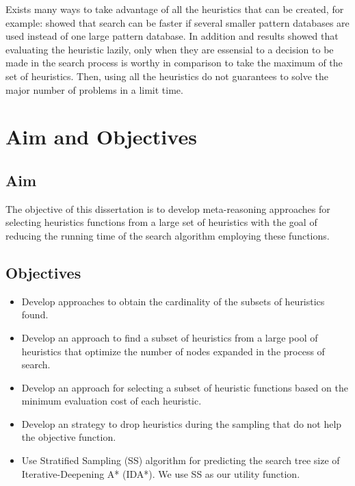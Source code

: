 Exists many ways to take advantage of all the heuristics that can be created, for example: \citep{holte2006maximizing} showed that search can be faster if several smaller pattern databases are used instead of one large pattern database. In addition \citep{domshlak2010max} and \citep{tolpin2013towards} results showed that evaluating the heuristic lazily, only when they are essensial to a decision to be made in the search process is worthy in comparison to take the maximum of the set of heuristics. Then, using all the heuristics do not guarantees to solve the major number of problems in a limit time.

\section{Aim and Objectives}
\subsection{Aim}
\noindent
The objective of this dissertation is to develop meta-reasoning approaches for selecting heuristics functions from a large set of heuristics with the goal of reducing the running time of the search algorithm employing these functions.

\subsection{Objectives}
\noindent

\begin{itemize}
  \item Develop approaches to obtain the cardinality of the subsets of heuristics found.
  
  \item Develop an approach to find a subset of heuristics from a large pool of heuristics that optimize the number of nodes expanded in the process of search.
  
  \item Develop an approach for selecting a subset of heuristic functions based on the minimum evaluation cost of each heuristic.
  
  \item Develop an strategy to drop heuristics during the sampling that do not help the objective function.  
  
  \item Use Stratified Sampling (SS) algorithm for predicting the search tree size of Iterative-Deepening A* (IDA*). We use SS as our utility function.
   
\end{itemize}

